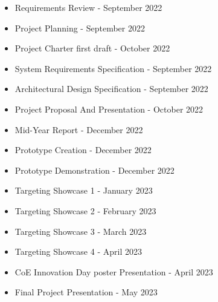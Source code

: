 \begin{itemize}
  \item Requirements Review - September 2022
  \item Project Planning - September 2022
  \item Project Charter first draft - October 2022
  \item System Requirements Specification - September 2022
  \item Architectural Design Specification - September 2022
  \item Project Proposal And Presentation - October 2022
  \item Mid-Year Report - December 2022
  \item Prototype Creation - December 2022
  \item Prototype Demonstration - December 2022
  \item Targeting Showcase 1 - January 2023
  \item Targeting Showcase 2 - February 2023
  \item Targeting Showcase 3 - March 2023
  \item Targeting Showcase 4 - April 2023
  \item CoE Innovation Day poster Presentation - April 2023
  \item Final Project Presentation - May 2023 
\end{itemize}